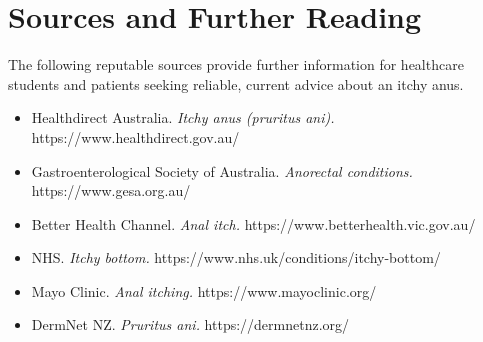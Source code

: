 \section*{Sources and Further Reading}
The following reputable sources provide further information for healthcare students and patients seeking reliable, current advice about an itchy anus.
\begin{itemize}
    \item Healthdirect Australia. \textit{Itchy anus (pruritus ani).} https://www.healthdirect.gov.au/
    \item Gastroenterological Society of Australia. \textit{Anorectal conditions.} https://www.gesa.org.au/
    \item Better Health Channel. \textit{Anal itch.} https://www.betterhealth.vic.gov.au/
    \item NHS. \textit{Itchy bottom.} https://www.nhs.uk/conditions/itchy-bottom/
    \item Mayo Clinic. \textit{Anal itching.} https://www.mayoclinic.org/
    \item DermNet NZ. \textit{Pruritus ani.} https://dermnetnz.org/
\end{itemize}

